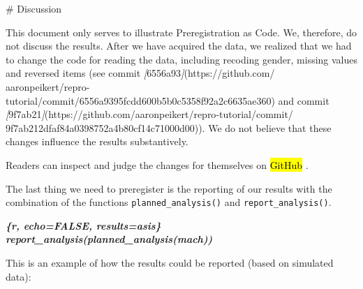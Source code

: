 \documentclass[psych,tutorial,accept,moreauthors,pdftex]{Definitions/mdpi}
\newenvironment{Shaded}{\begin{snugshade}}{\end{snugshade}}
\newcommand{\CommentTok}[1]{\textcolor[rgb]{0.56,0.35,0.01}{\textit{#1}}}
\newcommand{\FunctionTok}[1]{\textcolor[rgb]{0.00,0.00,0.00}{#1}}
\newcommand{\InformationTok}[1]{\textcolor[rgb]{0.56,0.35,0.01}{\textbf{\textit{#1}}}}
\newcommand{\NormalTok}[1]{#1}
\newcommand{\OtherTok}[1]{\textcolor[rgb]{0.56,0.35,0.01}{#1}}
\begin{document}
\nointerlineskip
\begin{adjustwidth}{0.5cm}{0cm} 
\begin{Shaded}
\begin{Highlighting}[]
\FunctionTok{\# Discussion}

\NormalTok{This document only serves to illustrate Preregistration as Code. We, therefore,}
\NormalTok{do not discuss the results. After we have acquired the data, we realized that}
\NormalTok{we had to change the code for reading the data, including recoding gender,}
\NormalTok{missing values and reversed items (see commit }\CommentTok{[}\OtherTok{6556a93}\CommentTok{]}\NormalTok{(https://github.com/}
\NormalTok{aaronpeikert/repro{-}tutorial/commit/6556a9395fcdd600b5b0c5358f92a2c6635ae360)}
\NormalTok{and commit }\CommentTok{[}\OtherTok{9f7ab21}\CommentTok{]}\NormalTok{(https://github.com/aaronpeikert/repro{-}tutorial/commit/}
\NormalTok{9f7ab212dfaf84a0398752a4b80cf14c71000d00)). We do not believe that these changes}
\NormalTok{influence the results substantively.}
\end{Highlighting}
\end{Shaded}
\end{adjustwidth}
\begin{paracol}{2}
\switchcolumn


Readers can inspect and judge the changes for themselves on \hl{GitHub}
.

The last thing we need to preregister is the reporting of our results
with the combination of the functions \texttt{planned\_analysis()} and
\texttt{report\_analysis()}.

\begin{adjustwidth}{0.5cm}{0cm} 
\begin{Shaded}
\begin{Highlighting}[]
\InformationTok{\textasciigrave{}\textasciigrave{}\textasciigrave{}\{r, echo=FALSE, results=\textquotesingle{}asis\textquotesingle{}\}}
\InformationTok{report\_analysis(planned\_analysis(mach))}
\InformationTok{\textasciigrave{}\textasciigrave{}\textasciigrave{}}
\end{Highlighting}
\end{Shaded}
\end{adjustwidth}

This is an example of how the results could be reported (based on
simulated data):

\vspace{+6pt}
\end{paracol}
\end{document}
